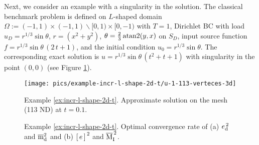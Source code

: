 \begin{example}
\label{ex:incr-l-shape-2d-t}

Next, we consider an example with a singularity in the solution. The classical benchmark 
problem is defined on $L$-shaped domain \linebreak
$\Omega := (\minus 1, 1) \times (\minus 1, 1) 
\backslash [0, 1) \times [0, \minus 1)$ with $T = 1$, 
Dirichlet BC with load \linebreak
$u_D = r^{1/3} \sin \theta $, 
$r = (x^2 + y^2)$, $\theta = \tfrac23 \, {\rm atan2} (y, x)$ on $S_D$,
%
input source function 
$f = r^{1/3} 
    \sin \theta \, \left(2 \, t + 1 \right)$,
%
and the initial condition 
$u_0 = r^{1/3} \sin \theta$. 
%
The 
corresponding exact solution is 
$u = r^{1/3} \sin \theta \, 
\left(t^2 + t + 1 \right)$ with singularity in the point $(0, 0)$ 
(see Figure \ref{fig:example-incr-l-shape-approx}).
%
\clearpage
\begin{figure}[!ht]
	\centering
	\texttt{[image: pics/example-incr-l-shape-2d-t/u-1-113-verteces-3d]}
	\caption{Example \ref{ex:incr-l-shape-2d-t}. 
	Approximate solution on the mesh (113 ND) at $t = 0.1$.}	
	\label{fig:example-incr-l-shape-approx}	
\end{figure}
\vskip -10pt	
%
%
\begin{figure}[!ht]
	\centering
	\caption{Example \ref{ex:incr-l-shape-2d-t}. 
	Optimal convergence rate of (a) ${e}^{\,2}_{\mathrm{d}}$ and $\overline{\mathrm m}^2_{\mathrm{d}}$ and (b) ${[\,e\,]\,}^2$ and $\overline{\mathrm M}^{\,2}_{\mathrm{I}}$.}	
	\label{fig:example-incr-l-shape-uniform-convergence-ed-md}

\end{figure}
\end{example}
